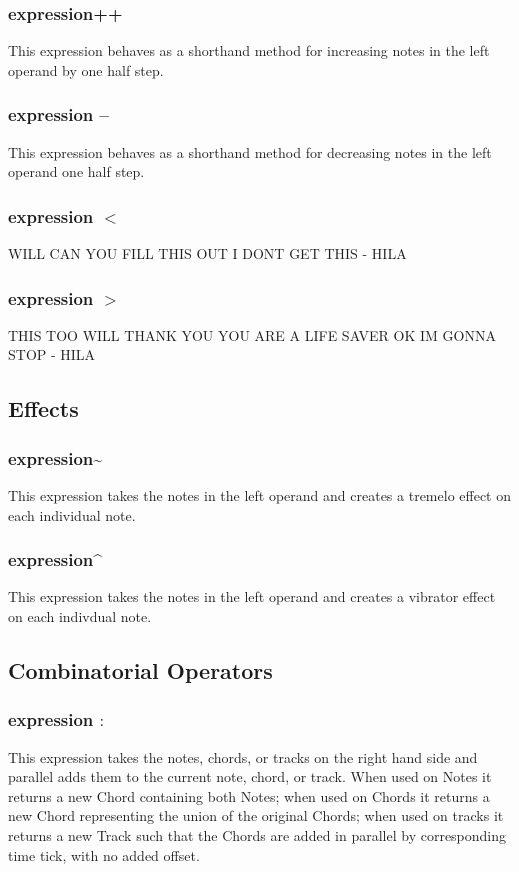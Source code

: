 \documentclass[letterpaper]{article}
\begin{document}
\subsubsection{expression++}
This expression behaves as a shorthand method for increasing notes in the left operand by one half step. 

\subsubsection{expression --}
This expression behaves as a shorthand method for decreasing notes in the left operand one half step. 

\subsubsection{expression $<$}
WILL CAN YOU FILL THIS OUT I DONT GET THIS - HILA

\subsubsection{expression $>$}
THIS TOO WILL THANK YOU YOU ARE A LIFE SAVER OK IM GONNA STOP - HILA

\subsection{Effects}

\subsubsection{expression\~{}}
This expression takes the notes in the left operand and creates a tremelo effect on each individual note. 

\subsubsection{expression\^{} }
This expression takes the notes in the left operand and creates a vibrator effect on each indivdual note. 

\subsection{Combinatorial Operators}
\subsubsection{expression $:$}
This expression takes the notes, chords, or tracks on the right hand side and parallel adds them to the current note, chord, or track. When used on Notes it returns a new Chord containing both Notes; when used on Chords it returns a new Chord representing the union of the original Chords; when used on tracks it returns a new Track such that the Chords are added in parallel by corresponding time tick, with no added offset. 
\end{document}
